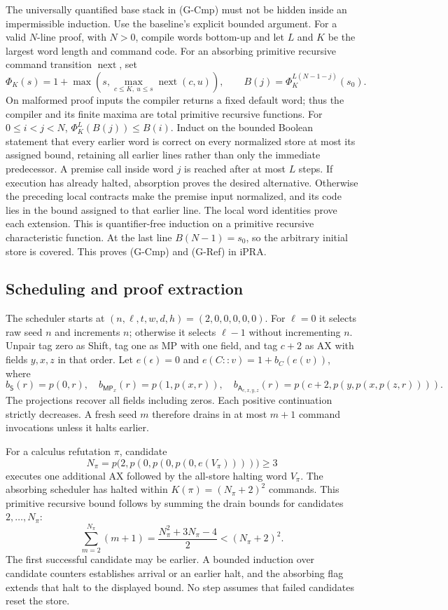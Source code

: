The universally quantified base stack in (G-Cmp) must not be hidden
inside an impermissible induction.  Use the baseline's explicit bounded
argument.  For a valid $N$-line proof, with $N>0$, compile words bottom-up and let
$L$ and $K$ be the largest word length and command code.  For an absorbing
primitive recursive command transition $\operatorname{next}$, set
\[
 \Phi_K(s)=1+\max\left(s,
             \max_{c\le K,\ u\le s}\operatorname{next}(c,u)\right),
 \qquad B(j)=\Phi_K^{L(N-1-j)}(s_0).
\]
On malformed proof inputs the compiler returns a fixed default word;
thus the compiler and its finite maxima are total primitive recursive
functions.  For $0\le i<j<N$,
$\Phi_K^L(B(j))\le B(i)$.  Induct on the bounded Boolean statement
that every earlier word is correct on every normalized store at most
its assigned bound, retaining all earlier lines rather than only the
immediate predecessor.  A premise call inside word $j$ is reached after
at most $L$ steps.  If execution has already halted, absorption proves
the desired alternative.  Otherwise the preceding local contracts make
the premise input normalized, and its code lies in the bound assigned to
that earlier line.  The local word identities prove each extension.  This is
quantifier-free induction on a primitive recursive characteristic
function.  At the last line $B(N-1)=s_0$, so the arbitrary initial
store is covered.  This proves (G-Cmp) and (G-Ref) in iPRA.

\subsection{Scheduling and proof extraction}

The scheduler starts at $(n,\ell,t,w,d,h)=(2,0,0,0,0,0)$.
For $\ell=0$ it selects raw seed $n$ and increments $n$; otherwise
it selects $\ell-1$ without incrementing $n$.  Unpair tag zero as
Shift, tag one as MP with one field, and tag $c+2$ as AX with fields
$y,x,z$ in that order.  Let $e(\epsilon)=0$ and
$e(C::v)=1+b_C(e(v))$, where
\[
 b_{\mathsf S}(r)=p(0,r),\quad
 b_{\mathsf{MP}_x}(r)=p(1,p(x,r)),\quad
 b_{\mathsf A_{c,x,y,z}}(r)=p(c+2,p(y,p(x,p(z,r)))).
\]
The projections recover all fields including zeros.  Each positive
continuation strictly decreases.  A fresh seed $m$ therefore drains in
at most $m+1$ command invocations unless it halts earlier.

For a calculus refutation $\pi$, candidate
\[
 N_\pi=p\bigl(2,p(0,p(0,p(0,e(V_\pi))))\bigr)\ge3
\]
executes one additional AX followed by the all-store halting word
$V_\pi$.  The absorbing scheduler has halted within
$K(\pi)=(N_\pi+2)^2$ commands.  This primitive recursive bound
follows by summing the drain bounds for candidates $2,\ldots,N_\pi$:
\[
 \sum_{m=2}^{N_\pi}(m+1)
       =\frac{N_\pi^2+3N_\pi-4}{2}<(N_\pi+2)^2.
\]
The first successful candidate may be earlier.  A bounded induction over
candidate counters establishes arrival or an earlier halt, and the
absorbing flag extends that halt to the displayed bound.  No step
assumes that failed candidates reset the store.

